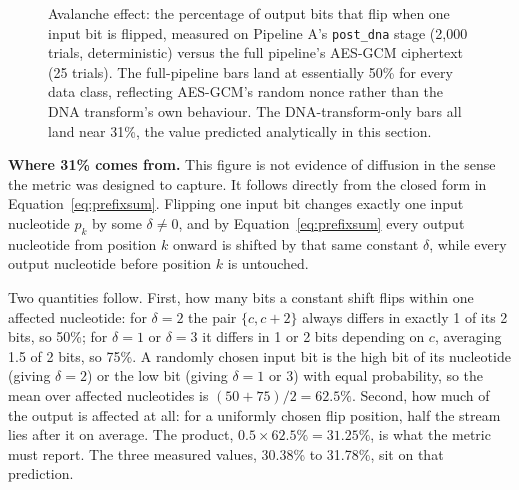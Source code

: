 \documentclass[12pt,a4paper,twoside]{report}
\numberwithin{equation}{chapter}
\begin{document}
\begin{figure}[H]
\centering
{}
\caption{Avalanche effect: the percentage of output bits that flip when
one input bit is flipped, measured on Pipeline A's \texttt{post\_dna}
stage (2,000 trials, deterministic) versus the full pipeline's AES-GCM
ciphertext (25 trials). The full-pipeline bars land at essentially
50\% for every data class, reflecting AES-GCM's random nonce rather
than the DNA transform's own behaviour. The DNA-transform-only bars all
land near 31\%, the value predicted analytically in this section.}
\label{fig:avalanche-comparison}
\end{figure}

\textbf{Where 31\% comes from.} This figure is not evidence of
diffusion in the sense the metric was designed to capture. It follows
directly from the closed form in Equation~\ref{eq:prefixsum}. Flipping
one input bit changes exactly one input nucleotide $p_k$ by some
$\delta \ne 0$, and by Equation~\ref{eq:prefixsum} every output
nucleotide from position $k$ onward is shifted by that same constant
$\delta$, while every output nucleotide before position $k$ is
untouched.

Two quantities follow. First, how many bits a constant shift flips
within one affected nucleotide: for $\delta = 2$ the pair
$\{c, c+2\}$ always differs in exactly 1 of its 2 bits, so 50\%; for
$\delta = 1$ or $\delta = 3$ it differs in 1 or 2 bits depending on
$c$, averaging 1.5 of 2 bits, so 75\%. A randomly chosen input bit is
the high bit of its nucleotide (giving $\delta = 2$) or the low bit
(giving $\delta = 1$ or 3) with equal probability, so the mean over
affected nucleotides is $(50 + 75)/2 = 62.5\%$. Second, how much of the
output is affected at all: for a uniformly chosen flip position, half
the stream lies after it on average. The product,
$0.5 \times 62.5\% = 31.25\%$, is what the metric must report. The
three measured values, 30.38\% to 31.78\%, sit on that prediction.
\end{document}
